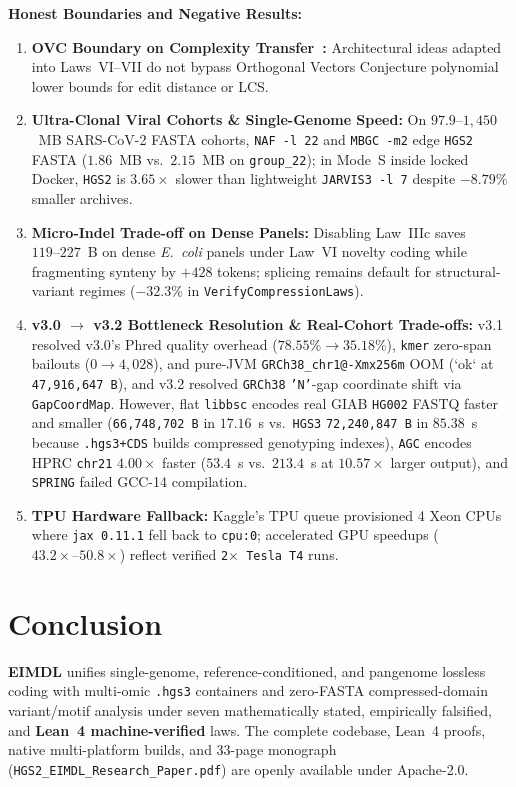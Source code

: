 \documentclass[10pt]{article}
\begin{document}
\noindent
\textbf{Honest Boundaries and Negative Results:}
\begin{enumerate}
  \item \textbf{OVC Boundary on Complexity Transfer~\cite{openai2026eth}:} Architectural ideas adapted into Laws~VI--VII do not bypass Orthogonal Vectors Conjecture polynomial lower bounds for edit distance or LCS.
  \item \textbf{Ultra-Clonal Viral Cohorts \& Single-Genome Speed:} On $97.9\text{--}1,450$~MB SARS-CoV-2 FASTA cohorts, \texttt{NAF~-l~22} and \texttt{MBGC~-m2} edge \texttt{HGS2} FASTA ($1.86$~MB vs.\ $2.15$~MB on \texttt{group\_22}); in Mode~S inside locked Docker, \texttt{HGS2} is $3.65\times$ slower than lightweight \texttt{JARVIS3~-l~7} despite $-8.79\%$ smaller archives.
  \item \textbf{Micro-Indel Trade-off on Dense Panels:} Disabling Law~IIIc saves $119\text{--}227$~B on dense \textit{E.~coli} panels under Law~VI novelty coding while fragmenting synteny by $+428$ tokens; splicing remains default for structural-variant regimes ($-32.3\%$ in \texttt{VerifyCompressionLaws}).
  \item \textbf{v3.0 $\to$ v3.2 Bottleneck Resolution \& Real-Cohort Trade-offs:} v3.1 resolved v3.0's Phred quality overhead ($78.55\% \to 35.18\%$), \texttt{kmer} zero-span bailouts ($0 \to 4,028$), and pure-JVM \texttt{GRCh38\_chr1@-Xmx256m} OOM (`ok` at \texttt{47,916,647~B}), and v3.2 resolved \texttt{GRCh38} \texttt{'N'}-gap coordinate shift via \texttt{GapCoordMap}. However, flat \texttt{libbsc} encodes real GIAB \texttt{HG002} FASTQ faster and smaller (\texttt{66,748,702~B} in $17.16$~s vs.\ \texttt{HGS3} \texttt{72,240,847~B} in $85.38$~s because \texttt{.hgs3+CDS} builds compressed genotyping indexes), \texttt{AGC} encodes HPRC \texttt{chr21} $4.00\times$ faster ($53.4$~s vs.\ $213.4$~s at $10.57\times$ larger output), and \texttt{SPRING} failed GCC-14 compilation.
  \item \textbf{TPU Hardware Fallback:} Kaggle's TPU queue provisioned 4 Xeon CPUs where \texttt{jax~0.11.1} fell back to \texttt{cpu:0}; accelerated GPU speedups ($43.2\times\text{--}50.8\times$) reflect verified \texttt{2$\times$ Tesla T4} runs.
\end{enumerate}

\section{Conclusion}

\textbf{EIMDL} unifies single-genome, reference-conditioned, and pangenome lossless coding with multi-omic \texttt{.hgs3} containers and zero-FASTA compressed-domain variant/motif analysis under seven mathematically stated, empirically falsified, and \textbf{Lean~4 machine-verified} laws. The complete codebase, Lean~4 proofs, native multi-platform builds, and 33-page monograph (\texttt{HGS2\_EIMDL\_Research\_Paper.pdf}) are openly available under Apache-2.0.



\end{document}
